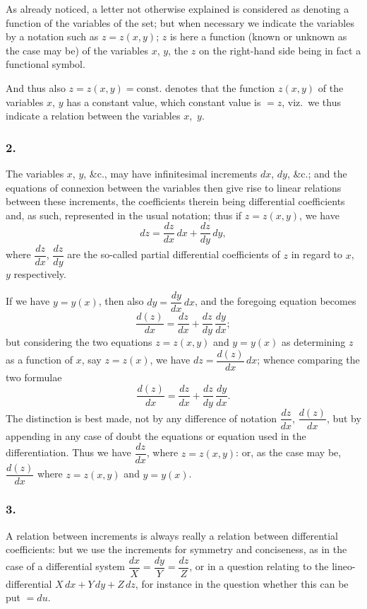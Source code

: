 \documentclass[11pt,a4paper]{book}
\begin{document}
As already noticed, a letter not otherwise explained is considered as denoting a function of the variables of the set; but when necessary we indicate the variables by a notation such as $z = z(x, y)$; $z$ is here a function (known or unknown as the case may be) of the variables $x$, $y$, the $z$ on the right-hand side being in fact a functional symbol.

And thus also $z = z(x, y) = \text{const.}$ denotes that the function $z(x, y)$ of the variables $x$, $y$ has a constant value, which constant value is $=z$, viz.~we thus indicate a relation between the variables $x$,~$y$.

\newpage
\setcounter{page}{115}

\subsubsection*{2.}

The variables $x$, $y$, \&c., may have infinitesimal increments $dx$, $dy$, \&c.; and the equations of connexion between the variables then give rise to linear relations between these increments, the coefficients therein being differential coefficients and, as such, represented in the usual notation; thus if $z = z(x, y)$, we have
\[
dz = \frac{dz}{dx}\,dx + \frac{dz}{dy}\,dy,
\]
where $\dfrac{dz}{dx}$, $\dfrac{dz}{dy}$ are the so-called partial differential coefficients of $z$ in regard to $x$, $y$ respectively.

If we have $y = y(x)$, then also $dy = \dfrac{dy}{dx}\,dx$, and the foregoing equation becomes
\[
\frac{d(z)}{dx} = \frac{dz}{dx} + \frac{dz}{dy}\,\frac{dy}{dx};
\]
but considering the two equations $z = z(x, y)$ and $y = y(x)$ as determining $z$ as a function of $x$, say $z = z(x)$, we have $dz = \dfrac{d(z)}{dx}\,dx$; whence comparing the two formulae
\[
\frac{d(z)}{dx} = \frac{dz}{dx} + \frac{dz}{dy}\,\frac{dy}{dx}.
\]
The distinction is best made, not by any difference of notation $\dfrac{dz}{dx}$, $\dfrac{d(z)}{dx}$, but by appending in any case of doubt the equations or equation used in the differentiation. Thus we have $\dfrac{dz}{dx}$, where $z = z(x, y)$: or, as the case may be, $\dfrac{d(z)}{dx}$ where $z = z(x, y)$ and $y = y(x)$.

\subsubsection*{3.}

A relation between increments is always really a relation between differential coefficients: but we use the increments for symmetry and conciseness, as in the case of a differential system $\dfrac{dx}{X} = \dfrac{dy}{Y} = \dfrac{dz}{Z}$, or in a question relating to the lineo-differential $X\,dx + Y\,dy + Z\,dz$, for instance in the question whether this can be put $= du$.
\end{document}
